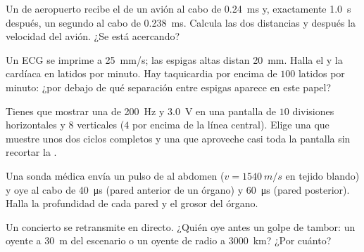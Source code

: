 \begin{exercise}[$\star\star$]\label{exo:g10:signals-and-waves:7}
Un  de aeropuerto recibe el  de un avión al cabo de
\qty{0.24}{ms} y, exactamente \qty{1.0}{s} después, un segundo  al
cabo de \qty{0.238}{ms}. Calcula las dos distancias y después la
velocidad del avión. ¿Se está acercando?
\end{exercise}

\begin{exercise}[$\star\star$]\label{exo:g10:signals-and-waves:8}
Un ECG se imprime a \qty{25}{mm/s}; las espigas altas distan
\qty{20}{mm}. Halla el  y la  cardíaca en latidos por
minuto. Hay taquicardia por encima de $100$ latidos por minuto: ¿por
debajo de qué separación entre espigas aparece en este papel?
\end{exercise}

\begin{exercise}[$\star\star$]\label{exo:g10:signals-and-waves:9}
Tienes que mostrar una  de \qty{200}{Hz} y  \qty{3.0}{V} en
una pantalla de $10$ divisiones horizontales y $8$ verticales ($4$ por
encima de la línea central). Elige una  que muestre unos
dos ciclos completos y una  que aproveche casi toda la pantalla
sin recortar la .
\end{exercise}

\begin{exercise}[$\star\star$]\label{exo:g10:signals-and-waves:10}
Una sonda médica envía un pulso de  al abdomen
($v = \qty{1540}{m/s}$ en tejido blando) y oye  al cabo de
\qty{40}{\micro s} (pared anterior de un órgano) y \qty{60}{\micro s}
(pared posterior). Halla la profundidad de cada pared y el grosor del
órgano.
\end{exercise}

\begin{exercise}[$\star\star$]\label{exo:g10:signals-and-waves:11}
Un concierto se retransmite en directo. ¿Quién oye antes un golpe de
tambor: un oyente a \qty{30}{m} del escenario o un oyente de radio a
\qty{3000}{km}? ¿Por cuánto?
\end{exercise}

